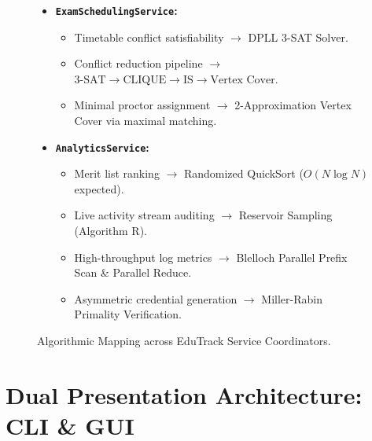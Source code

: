 \begin{figure}[H]
\begin{tcolorbox}[colback=codebackground,colframe=primaryblue,title=\textbf{EduTrack Service Layer Workflow Mapping}]
\begin{itemize}
\begin{itemize}
    \end{itemize}
    \item \textbf{\texttt{ExamSchedulingService}:}
    \begin{itemize}
        \item Timetable conflict satisfiability $\to$ DPLL 3-SAT Solver.
        \item Conflict reduction pipeline $\to$ $\text{3-SAT} \to \text{CLIQUE} \to \text{IS} \to \text{Vertex Cover}$.
        \item Minimal proctor assignment $\to$ 2-Approximation Vertex Cover via maximal matching.
    \end{itemize}
    \item \textbf{\texttt{AnalyticsService}:}
    \begin{itemize}
        \item Merit list ranking $\to$ Randomized QuickSort ($O(N \log N)$ expected).
        \item Live activity stream auditing $\to$ Reservoir Sampling (Algorithm R).
        \item High-throughput log metrics $\to$ Blelloch Parallel Prefix Scan \& Parallel Reduce.
        \item Asymmetric credential generation $\to$ Miller-Rabin Primality Verification.
    \end{itemize}
\end{itemize}
\end{tcolorbox}
\caption{Algorithmic Mapping across EduTrack Service Coordinators.}
\label{fig:service_mapping}
\end{figure}

\section{Dual Presentation Architecture: CLI \& GUI}

